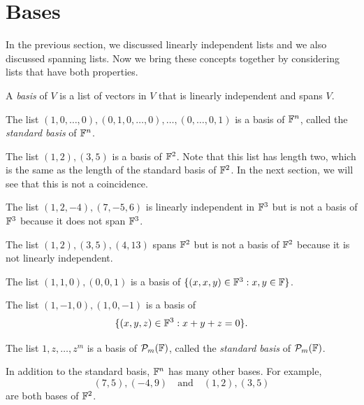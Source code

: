 \iftestbuild %
\setcounter{section}{1}\setcounter{theorem}{25}
\fi %
\providecommand\axeqnum[1]{\refstepcounter{theorem}\tag*{\thetheorem}\label{ax:#1}}
\section{Bases}

In the previous section, we discussed linearly independent lists and we also
discussed spanning lists. Now we bring these concepts together by considering
lists that have both properties.

\begin{definition}[Basis]\label{ax:2.26}
A \emph{basis} of $V$ is a list of vectors in $V$ that is linearly independent
and spans $V$.
\end{definition}

\begin{example}[Bases]\label{ax:2.27}\leavevmode
\begin{parts}
\item The list $(1,0,\dots,0),(0,1,0,\dots,0),\dots,(0,\dots,0,1)$ is a basis of
  $\mathbb{F}^n$, called the \emph{standard basis} of $\mathbb{F}^n$.
\item The list $(1,2),(3,5)$ is a basis of $\mathbb{F}^2$. Note that this list has
  length two, which is the same as the length of the standard basis of $\mathbb{F}^2$.
  In the next section, we will see that this is not a coincidence.
\item The list $(1,2,-4),(7,-5,6)$ is linearly independent in $\mathbb{F}^3$ but is not
  a basis of $\mathbb{F}^3$ because it does not span $\mathbb{F}^3$.
\item The list $(1,2),(3,5),(4,13)$ spans $\mathbb{F}^2$ but is not a basis of $\mathbb{F}^2$
  because it is not linearly independent.
\item The list $(1,1,0),(0,0,1)$ is a basis of $\{(x,x,y)\in\mathbb{F}^3 : x,y\in\mathbb{F}\}$.
\item The list $(1,-1,0),(1,0,-1)$ is a basis of
  \[ \{(x,y,z)\in\mathbb{F}^3 : x+y+z=0\}. \]
\item The list $1,z,\dots,z^m$ is a basis of $\mathcal{P}_m(\mathbb{F})$, called the
  \emph{standard basis} of $\mathcal{P}_m(\mathbb{F})$.
\end{parts}
\end{example}

In addition to the standard basis, $\mathbb{F}^n$ has many other bases. For example,
\[ (7,5),(-4,9) \quad\text{and}\quad (1,2),(3,5) \]
are both bases of $\mathbb{F}^2$.

